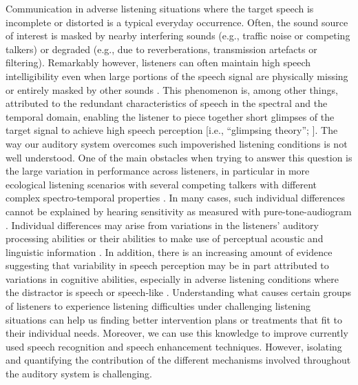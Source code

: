 \documentclass[a4paper, twoside]{templates/ociamthesis}
\begin{document}
Communication in adverse listening situations where the target speech is incomplete or distorted is a typical everyday occurrence. Often, the sound source of interest is masked by nearby interfering sounds (e.g., traffic noise or competing talkers) or degraded (e.g., due to reverberations, transmission artefacts or filtering). Remarkably however, listeners can often maintain high speech intelligibility even when large portions of the speech signal are physically missing or entirely masked by other sounds \autocite{Miller1950,Baskent2016}. This phenomenon is, among other things, attributed to the redundant characteristics of speech in the spectral and the temporal domain, enabling the listener to piece together short glimpses of the target signal to achieve high speech perception {[}i.e., ``glimpsing theory''; \textcite{Cooke2006}{]}.
The way our auditory system overcomes such impoverished listening conditions is not well understood.
One of the main obstacles when trying to answer this question is the large variation in performance across listeners, in particular in more ecological listening scenarios with several competing talkers with different complex spectro-temporal properties \autocite{Surprenant2001}.
In many cases, such individual differences cannot be explained by hearing sensitivity as measured with pure-tone-audiogram \autocite{Humes2010,Kidd2012}.
Individual differences may arise from variations in the listeners' auditory processing abilities or their abilities to make use of perceptual acoustic and linguistic information \autocite{Pichora-Fuller2006,Surprenant2001}.
In addition, there is an increasing amount of evidence suggesting that variability in speech perception may be in part attributed to variations in cognitive abilities, especially in adverse listening conditions where the distractor is speech or speech-like \autocites[see review by][]{Akeroyd2008,Arlinger2009,Kidd2012,VanEsch2013,Humes2013}.
Understanding what causes certain groups of listeners to experience listening difficulties under challenging listening situations can help us finding better intervention plans or treatments that fit to their individual needs. Moreover, we can use this knowledge to improve currently used speech recognition and speech enhancement techniques.
However, isolating and quantifying the contribution of the different mechanisms involved throughout the auditory system is challenging.\\
\end{document}
